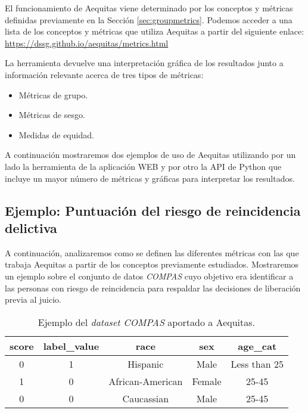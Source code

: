 El funcionamiento de Aequitas viene determinado por los conceptos y métricas definidas previamente en la Sección \ref{sec:groupmetrics}. Podemos acceder a una lista de los conceptos y métricas que utiliza Aequitas a partir del siguiente enlace: \url{https://dssg.github.io/aequitas/metrics.html}

La herramienta devuelve una interpretación gráfica de los resultados junto a información relevante acerca de tres tipos de métricas:

\begin{itemize}
    \item Métricas de grupo.
    \item Métricas de sesgo.
    \item Medidas de equidad.
\end{itemize}

A continuación mostraremos dos ejemplos de uso de Aequitas utilizando por un lado la herramienta de la aplicación WEB y por otro la API de Python que incluye un mayor número de métricas y gráficas para interpretar los resultados.

\subsection{Ejemplo: Puntuación del riesgo de reincidencia delictiva}

A continuación, analizaremos como se definen las diferentes métricas con las que trabaja Aequitas a partir de los conceptos previamente estudiados. Mostraremos un ejemplo sobre el conjunto de datos \textit{COMPAS} cuyo objetivo era identificar a las personas con riesgo de reincidencia para respaldar las decisiones de liberación previa al juicio.\\

\begin{table}[h]
\centering
\resizebox{12.4cm}{!} {
\begin{tabular}{|c|c|c|c|c|}
\hline
\textbf{score} & \textbf{label\_value} & \textbf{race}    & \textbf{sex} & \textbf{age\_cat} \\ \hline
0             & 1                     & Hispanic & Male       & Less than 25             \\ \hline
1              & 0                     & African-American         & Female         & 25-45     \\ \hline
0              & 0                     & Caucassian       & Male         & 25-45            \\ \hline
\end{tabular}
}
\caption{Ejemplo del \textit{dataset COMPAS} aportado a Aequitas.}
\label{tab:ejcompasaeq}
\end{table}

